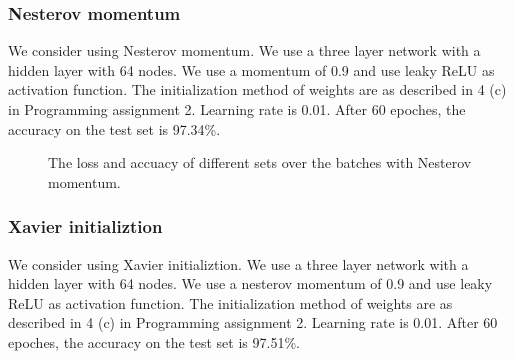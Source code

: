 \documentclass{article} %
\begin{document}
\subsubsection{Nesterov momentum}
We consider using Nesterov momentum. We use a three layer network with a hidden layer with 64 nodes. We use a momentum of 0.9 and use leaky ReLU as activation function. The initialization method of weights are as described in 4 (c) in Programming assignment 2. Learning rate is 0.01. After 60 epoches, the accuracy on the test set is 97.34\%.

\begin{figure} [!htbp]
	
	\caption{The loss and accuacy of different sets over the batches with Nesterov momentum. }  
	
\end{figure}


\subsubsection{Xavier initializtion}
We consider using Xavier initializtion. We use a three layer network with a hidden layer with 64 nodes. We use a nesterov momentum of 0.9 and use leaky ReLU as activation function. The initialization method of weights are as described in 4 (c) in Programming assignment 2. Learning rate is 0.01. After 60 epoches, the accuracy on the test set is 97.51\%. 
\end{document}
